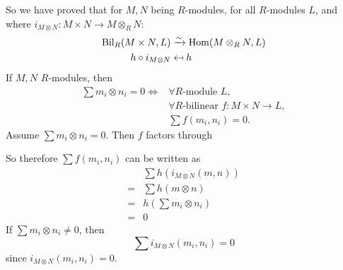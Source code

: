 \documentclass{article}
\begin{document}
So we have proved that for $M,N$ being $R$-modules, for all $R$-modules $L$, and where $i_{M\otimes N} : M \times N \to M \otimes_{R} N$: \begin{align*} \operatorname{Bil}_{R}(M \times N, L) &\xrightarrow{\sim} \operatorname{Hom}(M\otimes_{R} N, L)\\
    h \circ i_{M \otimes N} &\mapsfrom h \end{align*}
\prop If $M,N$ $R$-modules, then \begin{align*}
    \sum m_{i} \otimes n_{i} = 0 \Longleftrightarrow &\forall R\text{-module } L,\\ &\forall R\text{-bilinear } f:M \times N \to L, \\ &\sum f(m_{i},n_{i})=0.
\end{align*}
\proof Assume $\sum m_{i} \otimes n_{i} = 0$. Then $f$ factors through \begin{center} 
    \end{center}
So therefore $\sum f(m_{i},n_{i})$ can be written as \begin{align*}
    &\sum h(i_{M \otimes N}(m,n))\\
    =&\sum h(m\otimes n)\\
    =&h\left(\sum m_{i} \otimes n_{i}\right) \tag{by linearity}\\
    =&0
\end{align*}
If $\sum m_{i} \otimes n_{i} \neq 0$, then \[ \sum i_{M \otimes N}(m_{i},n_{i}) = 0\] since $i_{M \otimes N}(m_{i},n_{i})=0$. \endproof
\end{document}
